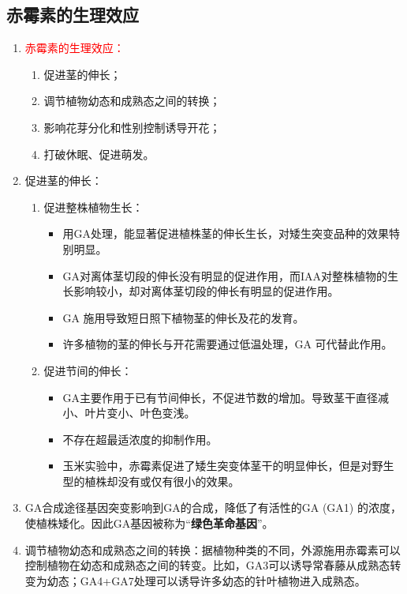 \subsection{赤霉素的生理效应}
\begin{enumerate}
    \item \textcolor{red}{赤霉素的生理效应：}
    \begin{enumerate}
        \item 促进茎的伸长；
        \item 调节植物幼态和成熟态之间的转换；
        \item 影响花芽分化和性别控制诱导开花；
        \item 打破休眠、促进萌发。
    \end{enumerate}
    \item 促进茎的伸长：
    \begin{enumerate}
        \item 促进整株植物生长：
        \begin{itemize}
            \item 用GA处理，能显著促进植株茎的伸长生长，对矮生突变品种的效果特别明显。
            \item GA对离体茎切段的伸长没有明显的促进作用，而IAA对整株植物的生长影响较小，却对离体茎切段的伸长有明显的促进作用。
            \item GA 施用导致短日照下植物茎的伸长及花的发育。
            \item 许多植物的茎的伸长与开花需要通过低温处理，GA 可代替此作用。
        \end{itemize}
        \item 促进节间的伸长：
        \begin{itemize}
            \item GA主要作用于已有节间伸长，不促进节数的增加。导致茎干直径减小、叶片变小、叶色变浅。
            \item 不存在超最适浓度的抑制作用。
            \item 玉米实验中，赤霉素促进了矮生突变体茎干的明显伸长，但是对野生型的植株却没有或仅有很小的效果。
        \end{itemize}
    \end{enumerate}
    \item GA合成途径基因突变影响到GA的合成，降低了有活性的GA (GA1) 的浓度，使植株矮化。因此GA基因被称为“\textbf{绿色革命基因}”。
    \item 调节植物幼态和成熟态之间的转换：据植物种类的不同，外源施用赤霉素可以控制植物在幼态和成熟态之间的转变。比如，GA3可以诱导常春藤从成熟态转变为幼态；GA4+GA7处理可以诱导许多幼态的针叶植物进入成熟态。

\end{enumerate}
